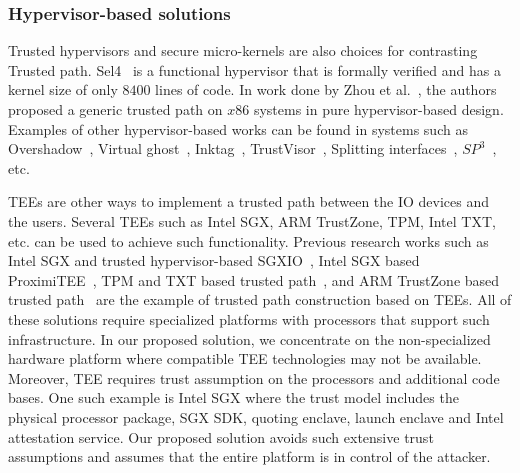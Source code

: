 
\subsubsection{Hypervisor-based solutions} Trusted hypervisors and secure micro-kernels are also choices for contrasting Trusted path. Sel4~\cite{klein2009sel4} is a functional hypervisor that is formally verified and has a kernel size of only $8400$ lines of code. In work done by Zhou et al.~\cite{zhou2012building}, the authors proposed a generic trusted path on $x86$ systems in pure hypervisor-based design. Examples of other hypervisor-based works can be found in systems such as Overshadow~\cite{Overshadow}, Virtual ghost~\cite{criswell2014virtual}, Inktag~\cite{hofmann2013inktag}, TrustVisor~\cite{mccune2010trustvisor}, Splitting interfaces~\cite{ta2006splitting}, $SP^3$~\cite{yang2008using}, etc.

 TEEs are other ways to implement a trusted path between the IO devices and the users. Several TEEs such as Intel SGX, ARM TrustZone, TPM, Intel TXT, etc. can be used to achieve such functionality. Previous research works such as Intel SGX and trusted hypervisor-based SGXIO~\cite{weiser2017sgxio}, Intel SGX based ProximiTEE~\cite{dhar2018proximitee}, TPM and TXT based trusted path~\cite{filyanov2011uni}, and ARM TrustZone based trusted path~\cite{filyanov2011uni,sun2015trustotp} are the example of trusted path construction based on TEEs. All of these solutions require specialized platforms with processors that support such infrastructure. In our proposed solution, we concentrate on the non-specialized hardware platform where compatible TEE technologies may not be available.
Moreover, TEE requires trust assumption on the processors and additional code bases. One such example is Intel SGX where the trust model includes the physical processor package, SGX SDK, quoting enclave, launch enclave and Intel attestation service. Our proposed solution avoids such extensive trust assumptions and assumes that the entire platform is in control of the attacker.


